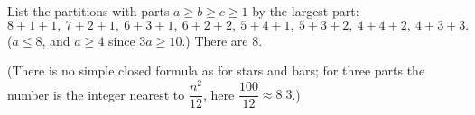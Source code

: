 List the partitions with parts $a\ge b\ge c\ge1$ by the largest part:
\[8+1+1,\ 7+2+1,\ 6+3+1,\ 6+2+2,\ 5+4+1,\ 5+3+2,\ 4+4+2,\ 4+3+3.\]
($a\le8$, and $a\ge4$ since $3a\ge10$.) There are $\boxed{8}$.

(There is no simple closed formula as for stars and bars; for three parts the number is the integer nearest to $\dfrac{n^2}{12}$, here $\dfrac{100}{12}\approx8.3$.)
